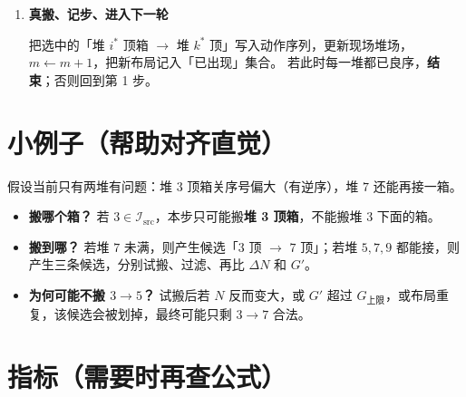 \documentclass[11pt,a4paper]{ctexart}
\newcommand{\capG}{G_{\mathrm{上限}}}
\begin{document}
\begin{enumerate}[label=\textbf{第 \arabic* 步}, leftmargin=2.2em]
  对每条合法候选算三个数（越大越好 / 越小越好见下）：
  \begin{itemize}
    \item $\Delta N = N - N'$：搬完逆序\textbf{少了几箱}（优先\textbf{尽量大}）；
    \item $G' = (m+1)+N'$：搬完的综合代价（在 $\Delta N$ 相同时优先\textbf{尽量小}）；
    \item 多贝时加分 $B$：源堆在初始逆序最多的贝（\texttt{drain\_bay}）$+2$，目标堆在初始逆序最少的贝（\texttt{fill\_bay}）$+1$（在仍打平时优先\textbf{大}）。
  \end{itemize}

  \textbf{排序规则（从上到下比，先比赢的优先）：}
  \[
    \Delta N \ \text{大}
    \ \rightarrow\
    G' \ \text{小}
    \ \rightarrow\
    B \ \text{大}
    \ \rightarrow\
    N' \ \text{小}.
  \]
  取排在最前面的一档；若这一档还有多条，\textbf{随机抽一条}执行。

  \item \textbf{真搬、记步、进入下一轮}

  把选中的「堆 $i^\ast$ 顶箱 $\to$ 堆 $k^\ast$ 顶」写入动作序列，更新现场堆场，$m\leftarrow m+1$，把新布局记入「已出现」集合。
  若此时每一堆都已良序，\textbf{结束}；否则回到第 1 步。

\end{enumerate}

\section{小例子（帮助对齐直觉）}

假设当前只有两堆有问题：堆 $3$ 顶箱关序号偏大（有逆序），堆 $7$ 还能再接一箱。
\begin{itemize}
  \item \textbf{搬哪个箱？} 若 $3\in\mathcal{I}_{\mathrm{src}}$，本步只可能搬\textbf{堆 3 顶箱}，不能搬堆 3 下面的箱。
  \item \textbf{搬到哪？} 若堆 $7$ 未满，则产生候选「$3$ 顶 $\to$ $7$ 顶」；若堆 $5,7,9$ 都能接，则产生三条候选，分别试搬、过滤、再比 $\Delta N$ 和 $G'$。
  \item \textbf{为何可能不搬 $3\to 5$？} 试搬后若 $N$ 反而变大，或 $G'$ 超过 $\capG$，或布局重复，该候选会被划掉，最终可能只剩 $3\to 7$ 合法。
\end{itemize}

\section{指标（需要时再查公式）}
\end{document}
